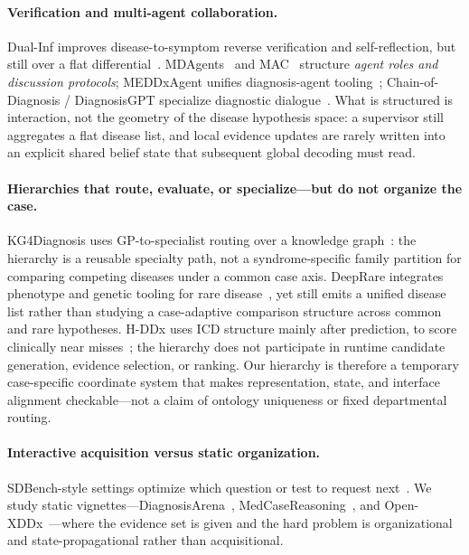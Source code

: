 \paragraph{Verification and multi-agent collaboration.}
Dual-Inf improves disease-to-symptom reverse verification and self-reflection, but still over a flat differential~\cite{dualinf2025}.
MDAgents~\cite{mdagents} and MAC~\cite{chen2025mac,mac2026} structure \emph{agent roles and discussion protocols}; MEDDxAgent unifies diagnosis-agent tooling~\cite{meddxagent2025}; Chain-of-Diagnosis / DiagnosisGPT specialize diagnostic dialogue~\cite{chainofdiagnosis}.
What is structured is interaction, not the geometry of the disease hypothesis space: a supervisor still aggregates a flat disease list, and local evidence updates are rarely written into an explicit shared belief state that subsequent global decoding must read.

\paragraph{Hierarchies that route, evaluate, or specialize---but do not organize the case.}
KG4Diagnosis uses GP-to-specialist routing over a knowledge graph~\cite{kg4diagnosis}: the hierarchy is a reusable specialty path, not a syndrome-specific family partition for comparing competing diseases under a common case axis.
DeepRare integrates phenotype and genetic tooling for rare disease~\cite{deeprare2025}, yet still emits a unified disease list rather than studying a case-adaptive comparison structure across common and rare hypotheses.
H-DDx uses ICD structure mainly after prediction, to score clinically near misses~\cite{hddx2025}; the hierarchy does not participate in runtime candidate generation, evidence selection, or ranking.
Our hierarchy is therefore a temporary case-specific coordinate system that makes representation, state, and interface alignment checkable---not a claim of ontology uniqueness or fixed departmental routing.

\paragraph{Interactive acquisition versus static organization.}
SDBench-style settings optimize which question or test to request next~\cite{sdbench2025}.
We study static vignettes---DiagnosisArena~\cite{diagnosisarena}, MedCaseReasoning~\cite{medcasereasoning}, and Open-XDDx~\cite{dualinf2025}---where the evidence set is given and the hard problem is organizational and state-propagational rather than acquisitional.

